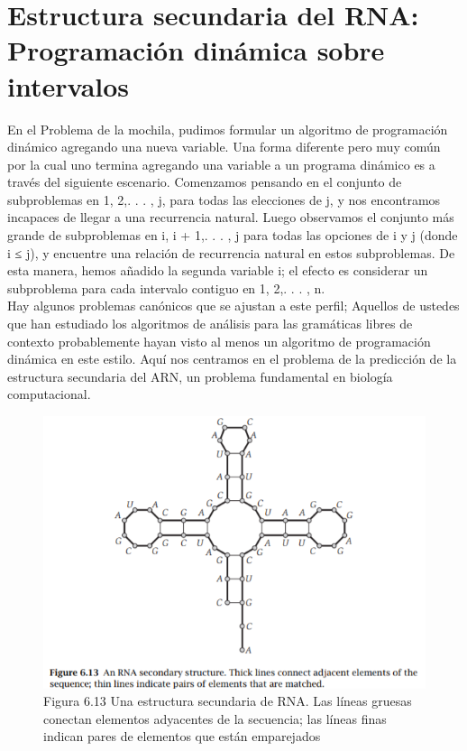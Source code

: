 \documentclass[a4paper, 12pt]{book}
\theoremstyle{dotless}
\begin{document}
\section{Estructura secundaria del RNA: Programación dinámica sobre intervalos}

En el Problema de la mochila, pudimos formular un algoritmo de programación dinámico agregando una nueva variable. Una forma diferente pero muy común por la cual uno termina agregando una variable a un programa dinámico es a través del siguiente escenario. Comenzamos pensando en el conjunto de subproblemas en {1, 2,. . . , j}, para todas las elecciones de j, y nos encontramos incapaces de llegar a una recurrencia natural. Luego observamos el conjunto más grande de subproblemas en {i, i + 1,. . . , j} para todas las opciones de i y j (donde i ≤ j), y encuentre una relación de recurrencia natural en estos subproblemas. De esta manera, hemos añadido la segunda variable i; el efecto es considerar un subproblema para cada intervalo contiguo en {1, 2,. . . , n}.\\

Hay algunos problemas canónicos que se ajustan a este perfil; Aquellos de ustedes que han estudiado los algoritmos de análisis para las gramáticas libres de contexto probablemente hayan visto al menos un algoritmo de programación dinámica en este estilo. Aquí nos centramos en el problema de la predicción de la estructura secundaria del ARN, un problema fundamental en biología computacional.\\

\begin{figure}[h]
\centering
\includegraphics[scale=1]{Imagenes-Seccion6/fig6_13.PNG}
\caption{Figura 6.13 Una estructura secundaria de RNA. Las líneas gruesas conectan elementos adyacentes de la secuencia; las líneas finas indican pares de elementos que están emparejados}
\end{figure}
\end{document}
